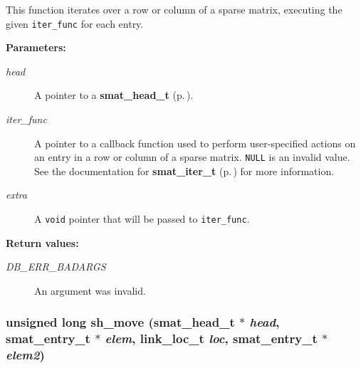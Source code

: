  This function iterates over a row or column of a sparse matrix, executing the given {\tt iter\_\-func} for each entry.\begin{Desc}
\item[{\bf Parameters: }]\par
\begin{description}
\item[
{\em head}]A pointer to a {\bf smat\_\-head\_\-t} {\rm (p.\,\pageref{group__dbprim__smat_a1})}. \item[
{\em iter\_\-func}]A pointer to a callback function used to perform user-specified actions on an entry in a row or column of a sparse matrix. {\tt NULL} is an invalid value. See the documentation for {\bf smat\_\-iter\_\-t} {\rm (p.\,\pageref{group__dbprim__smat_a4})} for more information. \item[
{\em extra}]A {\tt void} pointer that will be passed to {\tt iter\_\-func}.\end{description}
\end{Desc}
\begin{Desc}
\item[{\bf Return values: }]\par
\begin{description}
\item[
{\em DB\_\-ERR\_\-BADARGS}]An argument was invalid. \end{description}
\end{Desc}
\subsubsection{\setlength{\rightskip}{0pt plus 5cm}unsigned long sh\_\-move ({\bf smat\_\-head\_\-t} $\ast$ {\em head}, {\bf smat\_\-entry\_\-t} $\ast$ {\em elem}, {\bf link\_\-loc\_\-t} {\em loc}, {\bf smat\_\-entry\_\-t} $\ast$ {\em elem2})}\label{group__dbprim__smat_a18}





